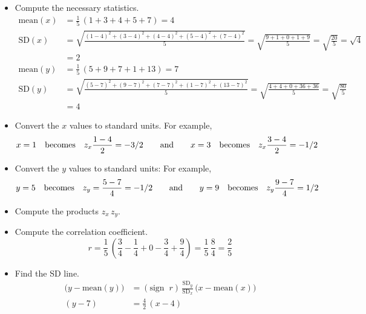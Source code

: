\documentclass[10pt]{article}
\begin{document}
\begin{itemize}
\item  Compute the necessary statistics.
\begin{align*}
\mbox{mean}(x) & = \frac{1}{5}\,(1 + 3 + 4 + 5 + 7) = 4\\
\mbox{SD}(x)   & = \sqrt{\frac{(1-4)^2 + (3-4)^2 + (4-4)^2 + (5-4)^2 + (7-4)^2}{5}} = 
   \sqrt{\frac{9 + 1 + 0 + 1 + 9}{5}} = \sqrt{\frac{20}{5}}=\sqrt{4} \\
               & =2\\
\mbox{mean}(y) &=\frac{1}{5}\,(5 + 9 + 7 + 1 + 13) = 7\\
\mbox{SD}(y)   &=\sqrt{\frac{(5-7)^2 + (9-7)^2 + (7-7)^2 + (1-7)^2 + (13-7)^2}{5}}
     = \sqrt{\frac{4 + 4 + 0 + 36 + 36}{5}} = \sqrt{\frac{80}{5}}\\
    & = 4
\end{align*}
\item Convert the $x$ values to standard units.  For example,
\[x = 1\mbox{\hspace{10pt}becomes\hspace{10pt}} z_x\frac{1-4}{2} = -3/2
\mbox{\hspace{20pt}and\hspace{20pt}}
x = 3\mbox{\hspace{10pt}becomes\hspace{10pt}} z_x\frac{3-4}{2} = -1/2\]
\item Convert the $y$ values to standard units:
For example,
\[y=5\mbox{\hspace{10pt}becomes\hspace{10pt}} z_y=\frac{5-7}{4} = -1/2
\mbox{\hspace{20pt}and\hspace{20pt}}
y=9\mbox{\hspace{10pt}becomes\hspace{10pt}}  z_y\frac{9-7}{4} = 1/2\]
\item Compute the products $z_x\,z_y$.
\item Compute the correlation coefficient.
\[r = \frac{1}{5}\,\left(\frac{3}{4} - \frac{1}{4} + 0 - \frac{3}{4} + \frac{9}{4}\right)
  = \frac{1}{5}\,\frac{8}{4} = \frac{2}{5}\]
\item Find the SD line.\vspace{-15pt}
\begin{align*}
\big(y-\mbox{mean}(y)\big) &= (\mbox{sign}\;\; r)\,\frac{\mbox{SD}_y}{\mbox{SD}_x}\,
   \big(x-\mbox{mean}(x)\big)\\
(y-7) & = \frac{4}{2}\,(x-4)\\

\end{align*}
\end{itemize}
\end{document}
